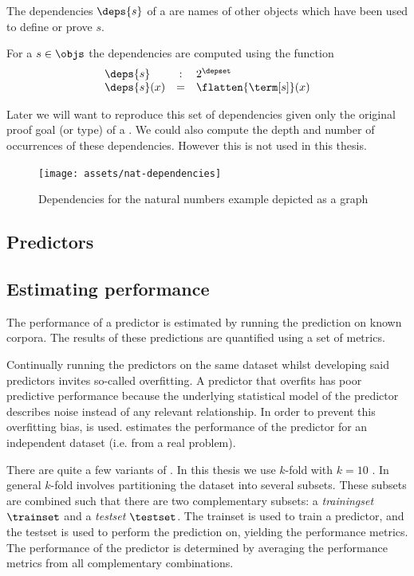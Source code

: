 The dependencies $\deps{s}$ of a \coqobj[s] are names of other objects which have been used to define or prove $s$.

\begin{definition}\label{def:deps}
  For a \coqobj $s \in \objs$ the dependencies are computed using the function
  $$
  \begin{array}{lcl}
    \deps{s} & : & 2^{\depset} \\
    \deps{s}(x) & = & \flatten{\term[s]}(x)
  \end{array}
  $$
\end{definition}

Later we will want to reproduce this set of dependencies given only the original proof goal (or type) of a \coqobj.
We could also compute the depth and number of occurrences of these dependencies.
However this is not used in this thesis.

\begin{figure}[H]
	\centerline{\texttt{[image: assets/nat-dependencies]}}
	\caption{Dependencies for the natural numbers example depicted as a graph}
\end{figure}

\subsection{Predictors}
\label{section:predictors}


\subsection{Estimating performance}
\label{section:estimating-performance}
The performance of a predictor is estimated by running the prediction on known corpora.
The results of these predictions are quantified using a set of metrics.

Continually running the predictors on the same dataset whilst developing said predictors invites so-called overfitting.
A predictor that overfits has poor predictive performance because the underlying statistical model of the predictor describes noise instead of any relevant relationship.
In order to prevent this overfitting bias, \crossvalidation is used.
\Crossvalidation estimates the performance of the predictor for an independent dataset (i.e. from a real problem).

There are quite a few variants of \crossvalidation.
In this thesis we use $k$-fold \crossvalidation with $k = 10$ \cite{kohavi1995study}.
In general $k$-fold \crossvalidation involves partitioning the dataset into several subsets.
These subsets are combined such that there are two complementary subsets: a \emph{trainingset} $\trainset$ and a \emph{testset} $\testset$.
The trainset is used to train a predictor, and the testset is used to perform the prediction on, yielding the performance metrics.
The performance of the predictor is determined by averaging the performance metrics from all complementary combinations.

